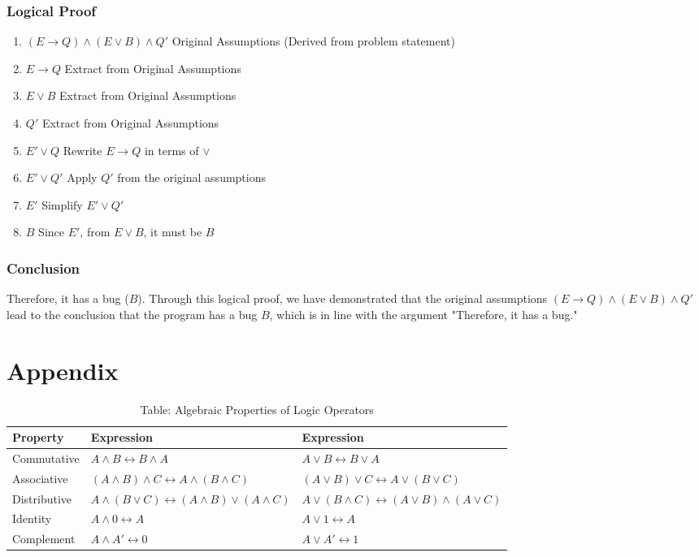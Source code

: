 \documentclass[12pt]{article}
\begin{document}
\subsubsection*{Logical Proof}
\begin{enumerate}
    \item \( (E \to Q) \land (E \lor B) \land Q' \) \hfill Original Assumptions (Derived from problem statement)
    \item \( E \to Q \) \hfill Extract from Original Assumptions
    \item \( E \lor B \) \hfill Extract from Original Assumptions
    \item \( Q' \) \hfill Extract from Original Assumptions
    \item \( E' \lor Q \) \hfill Rewrite \( E \to Q \) in terms of \( \lor \)
    \item \( E' \lor Q' \) \hfill Apply \( Q' \) from the original assumptions
    \item \( E' \) \hfill Simplify \( E' \lor Q' \)
    \item \( B \) \hfill Since \( E' \), from \( E \lor B \), it must be \( B \)
\end{enumerate}

\subsubsection*{Conclusion}
Therefore, it has a bug (\( B \)).
\newline \newline
Through this logical proof, we have demonstrated that the original assumptions \( (E \to Q) \land (E \lor B) \land Q' \) lead to the conclusion that the program has a bug \( B \), which is in line with the argument "Therefore, it has a bug."


\newpage
\section*{Appendix}
\begin{table}[h]
    \centering
    \caption*{Table: Algebraic Properties of Logic Operators}
    \begin{tabular}{l l l }
        \toprule
        Property & Expression & Expression \\
        \midrule
        Commutative & \( A \land B \leftrightarrow B \land A \) &  \( A \lor B \leftrightarrow B \lor A \) \\
        Associative & \( (A \land B) \land C \leftrightarrow A \land (B \land C) \) & \( (A \lor B) \lor C \leftrightarrow A \lor (B \lor C) \) \\
        Distributive & \( A \land (B \lor C) \leftrightarrow (A \land B) \lor (A \land C) \) & \( A \lor (B \land C) \leftrightarrow (A \lor B) \land (A \lor C) \) \\
        Identity & \( A \land 0 \leftrightarrow A \) &  \( A \lor 1 \leftrightarrow A \) \\
        Complement & \( A \land A' \leftrightarrow 0 \) &  \( A \lor A' \leftrightarrow 1 \) \\
        \bottomrule
    \end{tabular}
\end{table}
\end{document}
